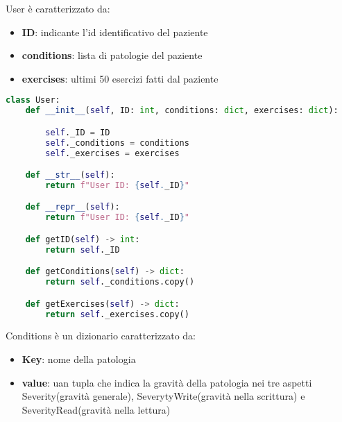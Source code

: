 \documentclass{article}
\begin{document}
User è caratterizzato da:
\begin{itemize}
\item\textbf{ID}: indicante l'id identificativo del paziente
\item\textbf{conditions}: lista di patologie del paziente
\item\textbf{exercises}: ultimi 50 esercizi fatti dal paziente
\end{itemize}
\begin{lstlisting}[language=Python, breaklines, no caption]
    class User:
    def __init__(self, ID: int, conditions: dict, exercises: dict):

        self._ID = ID
        self._conditions = conditions
        self._exercises = exercises

    def __str__(self):
        return f"User ID: {self._ID}"

    def __repr__(self):
        return f"User ID: {self._ID}"

    def getID(self) -> int:
        return self._ID

    def getConditions(self) -> dict:
        return self._conditions.copy()

    def getExercises(self) -> dict:
        return self._exercises.copy()
\end{lstlisting}

\pagebreak

Conditions è un dizionario caratterizzato da:
\begin{itemize}
\item\textbf{Key}: nome della patologia
\item\textbf{value}: uan tupla che indica la gravità della patologia nei tre aspetti Severity(gravità generale), SeverytyWrite(gravità nella scrittura) e SeverityRead(gravità nella lettura)
\end{itemize}
\end{document}

